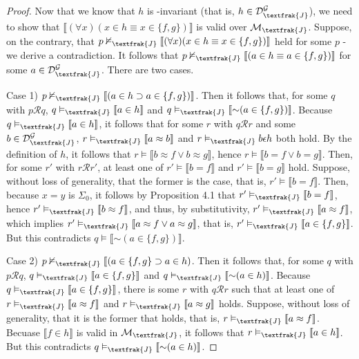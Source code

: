 \documentclass{article}
\newcommand*{\oldneg}{\mathord{\sim}}
\newcommand{\lbc}{\llbracket}
\newcommand{\rbc}{\rrbracket}
\theoremstyle{definition}
\begin{document}
\begin{proof}
Now that we know that $h$ is -invariant (that is, $h\in\mathcal{D}^\mathcal{G}_\textfrak{J}$), we need to show that 
$\lbc(\forall x)(x\in h\equiv x\in\{f,g\})\rbc$ is valid over $\mathcal{M}_\textfrak{J}$. Suppose, on the contrary, that 
$p\nvDash_\textfrak{J}\lbc(\forall x)(x\in h\equiv x\in\{f,g\})\rbc$ held for some $p$ - we derive a contradiction. It follows that 
$p\nvDash_\textfrak{J}\lbc(a\in h\equiv a\in\{f,g\})\rbc$ for some $a\in\mathcal{D}^\mathcal{G}_\textfrak{J}$. There are two cases.

Case 1) $p\nvDash_\textfrak{J}\lbc(a\in h\supset a\in\{f,g\})\rbc$. Then it follows that, for some $q$ with $p\mathcal{R}q$,
$q\vDash_\textfrak{J}\lbc a\in h\rbc$ and $q\vDash_\textfrak{J}\lbc\oldneg(a\in\{f,g\})\rbc$.
Because $q\vDash_\textfrak{J}\lbc a\in h\rbc$, it follows that 
for some $r$ with $q\mathcal{R}r$ and some $b\in\mathcal{D}^\mathcal{G}_\textfrak{J}$,
$r\vDash_\textfrak{J}\lbc a\approx b\rbc$ and 
$r\vDash_\textfrak{J} b\epsilon h$ both hold. By the definition of $h$, it follows that
$r\vDash\lbc b\approx f\vee b\approx g\rbc$, hence $r\vDash\lbc b=f\vee b=g\rbc$. Then, for some 
$r'$ with $r\mathcal{R}r'$, at least one of $r'\vDash\lbc b=f\rbc$ and $r'\vDash\lbc b=g\rbc$ hold. Suppose, without loss of generality, that 
the former is the case, that is, $r'\vDash\lbc b=f\rbc$. Then, because $x=y$ is $\Sigma_0$, it follows by Proposition 4.1 that
$r'\vDash_\textfrak{J}\lbc b=f\rbc$, hence $r'\vDash_\textfrak{J}\lbc b\approx f\rbc$, and thus, by substitutivity,
$r'\vDash_\textfrak{J}\lbc a\approx f\rbc$, which implies 
$r'\vDash_\textfrak{J}\lbc a\approx f\vee a\approx g\rbc$, that is, $r'\vDash_\textfrak{J}\lbc a\in\{f,g\}\rbc$. But this contradicts 
$q\vDash\lbc\oldneg(a\in\{f,g\})\rbc$. 

Case 2) $p\nvDash_\textfrak{J}\lbc(a\in\{f,g\}\supset a\in h)$. Then it follows that, for some $q$ with $p\mathcal{R}q$,
$q\vDash_\textfrak{J}\lbc a\in\{f,g\}\rbc$ and $q\vDash_\textfrak{J}\lbc\oldneg(a\in h)\rbc$. 
Because $q\vDash_\textfrak{J}\lbc a\in\{f,g\}\rbc$, there is some 
$r$ with $q\mathcal{R}r$ such that at least one of $r\vDash_\textfrak{J}\lbc a\approx f\rbc$ and 
$r\vDash_\textfrak{J}\lbc a\approx g\rbc$ holds. Suppose, without 
loss of generality, that it is the former that holds, that is, $r\vDash_\textfrak{J}\lbc a\approx f\rbc$. Becuase 
$\lbc f\in h\rbc$ is valid in $\mathcal{M}_\textfrak{J}$, it follows that 
$r\vDash_\textfrak{J}\lbc a\in h\rbc$. But this contradicts $q\vDash_\textfrak{J}\lbc\oldneg(a\in h)\rbc$. 

\end{proof}
\end{document}
